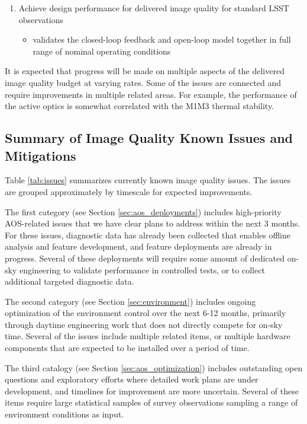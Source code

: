 \documentclass[SO,lsst,authoryear,toc]{lsstdoc}
\begin{document}
\begin{enumerate}
  \begin{itemize}
    \item validates application of differential corrections in the open-loop model
  \end{itemize}
  \item Achieve design performance for delivered image quality for standard LSST observations
  \begin{itemize}
    \item validates the closed-loop feedback and open-loop model together in full range of nominal operating conditions
  \end{itemize}
\end{enumerate}

It is expected that progress will be made on multiple aspects of the delivered image quality budget at varying rates.
Some of the issues are connected and require improvements in multiple related areas.
For example, the performance of the active optics is somewhat correlated with the M1M3 thermal stability.

\subsection{Summary of Image Quality Known Issues and Mitigations}

Table \ref{tab:issues} summarizes currently known image quality issues.
The issues are grouped approximately by timescale for expected improvements.

The first category (see Section \ref{sec:aos_deployments}) includes high-priority AOS-related issues that we have clear plans to address within the next 3 months.
For these issues, diagnostic data has already been collected that enables offline analysis and feature development, and feature deployments are already in progress.
Several of these deployments will require some amount of dedicated on-sky engineering to validate performance in controlled tests, or to collect additional targeted diagnostic data.

The second category (see Section \ref{sec:environment}) includes ongoing optimization of the environment control over the next 6-12 months, primarily through daytime engineering work that does not directly compete for on-sky time.
Several of the issues include multiple related items, or multiple hardware components that are expected to be installed over a period of time.

The third catalogy (see Section \ref{sec:aos_optimization}) includes outstanding open questions and exploratory efforts where detailed work plans are under development, and timelines for improvement are more uncertain.
Several of these items require large statistical samples of survey observations sampling a range of environment conditions as input.
\end{document}

